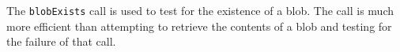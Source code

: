 The \verb+blobExists+ call is used to test for the existence of a blob. The call is much
more efficient than attempting to retrieve the contents of a blob and testing for the failure
of that call.
